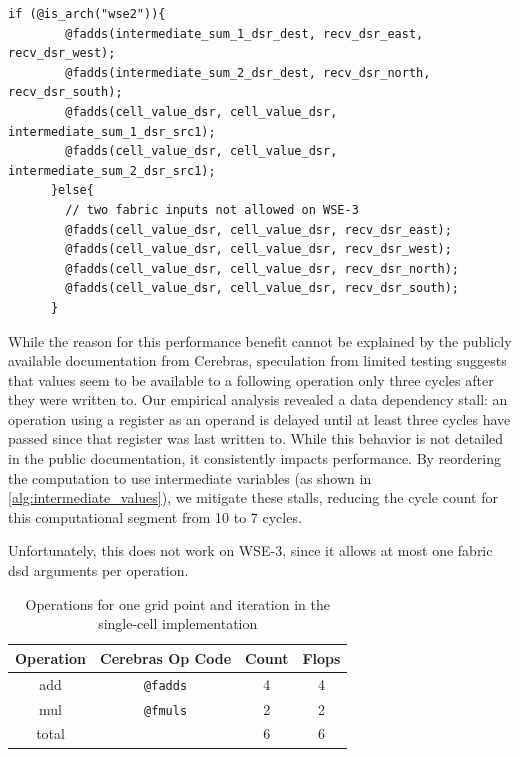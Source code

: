 
\begin{lstlisting}[language=CSL, caption={CSL code for the single-cell implementation}, label={lst:single_cell_implementation}]
    if (@is_arch("wse2")){
        @fadds(intermediate_sum_1_dsr_dest, recv_dsr_east, recv_dsr_west);
        @fadds(intermediate_sum_2_dsr_dest, recv_dsr_north, recv_dsr_south);
        @fadds(cell_value_dsr, cell_value_dsr, intermediate_sum_1_dsr_src1);
        @fadds(cell_value_dsr, cell_value_dsr, intermediate_sum_2_dsr_src1);
      }else{
        // two fabric inputs not allowed on WSE-3
        @fadds(cell_value_dsr, cell_value_dsr, recv_dsr_east);
        @fadds(cell_value_dsr, cell_value_dsr, recv_dsr_west);
        @fadds(cell_value_dsr, cell_value_dsr, recv_dsr_north);
        @fadds(cell_value_dsr, cell_value_dsr, recv_dsr_south);
      }
\end{lstlisting}


While the reason for this performance benefit cannot be explained by the publicly available documentation from Cerebras, speculation from limited testing suggests that values seem to be available to a following operation only three cycles after they were written to.
Our empirical analysis revealed a data dependency stall: an operation using a register as an operand is delayed until at least three cycles have passed since that register was last written to. While this behavior is not detailed in the public documentation, it consistently impacts performance. By reordering the computation to use intermediate variables (as shown in \autoref{alg:intermediate_values}), we mitigate these stalls, reducing the cycle count for this computational segment from 10 to 7 cycles.

Unfortunately, this does not work on WSE-3, since it allows at most one fabric \ac{dsd} arguments per operation.

\begin{table}[h]
    \centering
    \caption{Operations for one grid point and iteration in the single-cell implementation}
    \label{tab:r1_non_tiled_operations}
    \begin{tabular}{@{}cccc@{}}
        \toprule
        Operation & Cerebras Op Code & Count & Flops \\
        \midrule
        add & \texttt{@fadds} & \num{4} & \num{4} \\
        mul & \texttt{@fmuls} & \num{2} & \num{2} \\
        \midrule
        total & & \num{6} & \num{6} \\
        \bottomrule
    \end{tabular}
\end{table}

